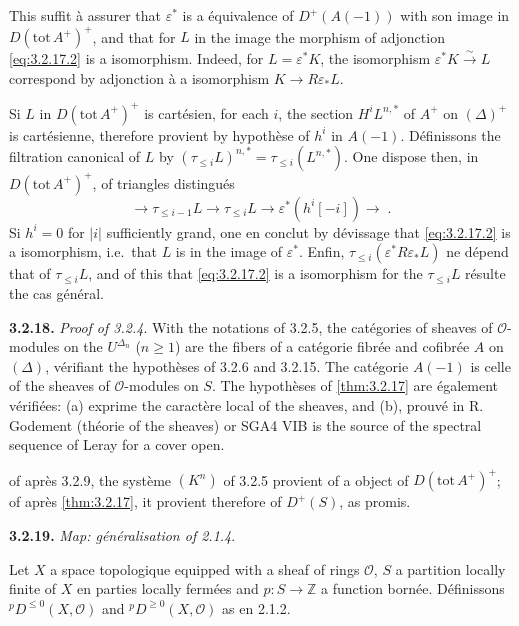 \documentclass[12pt,a4paper]{article}
\theoremstyle{plain}
\theoremstyle{definition}
\newcommand{\cO}{\mathcal{O}}
\newcommand{\isom}{\xrightarrow{\sim}}
\providecommand{\cO}{\mathcal{O}}
\begin{document}
This suffit \`{a} assurer that $\varepsilon^{*}$ is a \'{e}quivalence of $D^{+}(A(-1))$ with son image in $D(\mathrm{tot}\, A^{+})^{+}$, and that for $L$ in the image the morphism of adjonction \eqref{eq:3.2.17.2} is a isomorphism. Indeed, for $L = \varepsilon^{*}K$, the isomorphism $\varepsilon^{*}K \isom L$ correspond by adjonction \`{a} a isomorphism $K \longrightarrow R\varepsilon_{*}L$.

Si $L$ in $D(\mathrm{tot}\, A^{+})^{+}$ is cart\'{e}sien, for each $i$, the section $H^{i}L^{n,*}$ of $A^{+}$ on $(\Delta)^{+}$ is cart\'{e}sienne, therefore provient by hypoth\`{e}se of $h^{i}$ in $A(-1)$. D\'{e}finissons the filtration canonical of $L$ by $(\tau_{\leq i}L)^{n,*} = \tau_{\leq i}(L^{n,*})$. One dispose then, in $D(\mathrm{tot}\, A^{+})^{+}$, of triangles distingu\'{e}s
\[
\longrightarrow \tau_{\leq i-1}L \longrightarrow \tau_{\leq i}L \longrightarrow \varepsilon^{*}(h^{i}[-i]) \longrightarrow\;.
\]
Si $h^{i} = 0$ for $|i|$ sufficiently grand, one en conclut by d\'{e}vissage that \eqref{eq:3.2.17.2} is a isomorphism, i.e.\ that $L$ is in the image of $\varepsilon^{*}$. Enfin, $\tau_{\leq i}(\varepsilon^{*}R\varepsilon_{*}L)$ ne d\'{e}pend that of $\tau_{\leq i}L$, and of this that \eqref{eq:3.2.17.2} is a isomorphism for the $\tau_{\leq i}L$ r\'{e}sulte the cas g\'{e}n\'{e}ral.

\noindent\textbf{3.2.18.} \emph{Proof of \emph{3.2.4}}. With the notations of 3.2.5, the cat\'{e}gories of sheaves of $\cO$-modules on the $U^{\Delta_{n}}$ ($n \geq 1$) are the fibers of a cat\'{e}gorie fibr\'{e}e and cofibr\'{e}e $A$ on $(\Delta)$, v\'{e}rifiant the hypoth\`{e}ses of 3.2.6 and 3.2.15. The cat\'{e}gorie $A(-1)$ is celle of the sheaves of $\cO$-modules on $S$. The hypoth\`{e}ses of \ref{thm:3.2.17} are \'{e}galement v\'{e}rifi\'{e}es: (a) exprime the caract\`{e}re local of the sheaves, and (b), prouv\'{e} in R. Godement (th\'{e}orie of the sheaves) or SGA4 VIB is the source of the spectral sequence of Leray for a cover open.

of apr\`{e}s 3.2.9, the syst\`{e}me $(K^{n})$ of 3.2.5 provient of a object of $D(\mathrm{tot}\, A^{+})^{+}$; of apr\`{e}s \ref{thm:3.2.17}, it provient therefore of $D^{+}(S)$, as promis.

\noindent\textbf{3.2.19.} \emph{Map: g\'{e}n\'{e}ralisation of \emph{2.1.4}}.

Let $X$ a space topologique equipped with a sheaf of rings $\cO$, $S$ a partition locally finite of $X$ en parties locally ferm\'{e}es and $p: S \to \mathbb{Z}$ a function born\'{e}e. D\'{e}finissons ${}^{p}D^{\leq 0}(X,\cO)$ and ${}^{p}D^{\geq 0}(X,\cO)$ as en 2.1.2.
\end{document}
